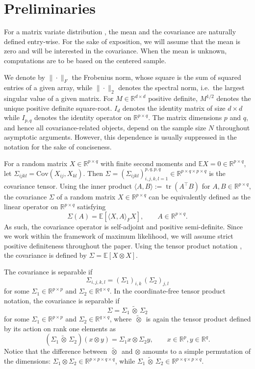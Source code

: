 \documentclass[12pt]{article}
\newcommand{\E}{\mathbb{E}}
\newcommand{\R}{\mathbb{R}}
\newcommand{\cov}{\mathrm{Cov}}
\newcommand{\tr}{\operatorname{tr}}
\newcommand{\ot}{\,\tilde\otimes\,}
\begin{document}
\section{Preliminaries}\label{sec:background}

For a matrix variate distribution \citep{gupta2018}, the mean and the covariance are naturally defined entry-wise. For the sake of exposition, we will assume that the mean is zero and will be interested in the covariance. When the mean is unknown, computations are to be based on the centered sample.


We denote by $\|\cdot\|_F$ the Frobenius norm, whose square is the sum of squared entries of a given array, while $\|\cdot\|_2$ denotes the spectral norm, i.e.~the largest singular value of a given matrix. For $M \in \R^{d \times d}$ positive definite, $M^{1/2}$ denotes the unique positive definite square-root. $I_{d}$ denotes the identity matrix of size $d \times d$ while $I_{p,q}$ denotes the identity operator on $\R^{p\times q}$. The matrix dimensions $p$ and $q$, and hence all covariance-related objects, depend on the sample size $N$ throughout asymptotic arguments. However, this dependence is usually suppressed in the notation for the sake of conciseness.


For a random matrix $X \in \R^{p \times q}$ with finite second moments and $\E X = 0 \in \R^{p \times q}$, let $\Sigma_{ijkl} = \cov(X_{ij},X_{kl})$. Then $\Sigma = (\Sigma_{ijkl})_{i,j,k,l=1}^{p,q,p,q} \in \R^{p \times q \times p \times q}$ is the covariance tensor. Using the inner product $\langle A , B \rangle := \tr(A^\top B)$ for $A,B \in \R^{p\times q}$, the covariance $\Sigma$ of a random matrix $X \in \R^{p\times q}$ can be equivalently defined as the linear operator on $\R^{p\times q}$ satisfying
\[
\Sigma(A)= \E[\langle X,A \rangle_F X],\qquad A \in \R^{p \times q}.
\]
As such, the covariance operator is self-adjoint and positive semi-definite. Since we work within the framework of maximum likelihood, we will assume strict positive definiteness throughout the paper. Using the tensor product notation \citep{weidmann2012}, the covariance is defined by $\Sigma  =\E[ X\otimes X]$.

\newpage
The covariance is separable if
\[
\Sigma_{i,j,k,l} = (\Sigma_1)_{i,k}\,(\Sigma_2)_{j,l}
\]
for some $\Sigma_1 \in \R^{p \times p}$ and $\Sigma_2 \in \R^{q \times q}$.
In the coordinate-free tensor product notation, the covariance is separable if
\begin{equation}\label{eq:separability}
  \Sigma = \Sigma_1 \ot \Sigma_2  
\end{equation}
for some $\Sigma_1 \in \R^{p \times p}$ and $\Sigma_2 \in \R^{q \times q}$, where $\ot$ is again the tensor product defined by its action on rank one elements as
\[
(\Sigma_1 \ot \Sigma_2)(x \otimes y) = \Sigma_1 x \otimes \Sigma_2 y, \qquad x \in \R^p, y \in \R^q.
\]
Notice that the difference between $\ot$ and $\otimes$ amounts to a simple permutation of the dimensions: $\Sigma_1 \otimes \Sigma_2 \in \R^{p \times p \times q \times q}$, while $\Sigma_1 \ot \Sigma_2 \in \R^{p \times q \times p \times q}$.
\end{document}
